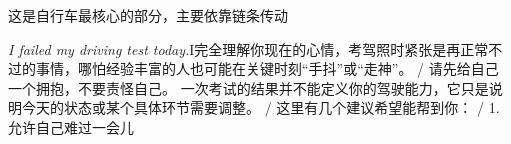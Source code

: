 \begin{multicols}{2}
这\allowbreak{}是\allowbreak{}自\allowbreak{}行\allowbreak{}车\allowbreak{}最\allowbreak{}核\allowbreak{}心\allowbreak{}的\allowbreak{}部\allowbreak{}分\allowbreak{}，\allowbreak{}主\allowbreak{}要\allowbreak{}依\allowbreak{}靠\allowbreak{}链\allowbreak{}条\allowbreak{}传\allowbreak{}动\allowbreak{}\par\noindent\textit{I failed my driving test today.}\enspace I完\allowbreak{}全\allowbreak{}理\allowbreak{}解\allowbreak{}你\allowbreak{}现\allowbreak{}在\allowbreak{}的\allowbreak{}心\allowbreak{}\allowbreak{}情\allowbreak{}，\allowbreak{}考\allowbreak{}驾\allowbreak{}照\allowbreak{}时\allowbreak{}紧\allowbreak{}张\allowbreak{}是\allowbreak{}再\allowbreak{}\allowbreak{}正\allowbreak{}常\allowbreak{}不\allowbreak{}过\allowbreak{}的\allowbreak{}事\allowbreak{}情\allowbreak{}，\allowbreak{}哪\allowbreak{}怕\allowbreak{}\allowbreak{}经\allowbreak{}验\allowbreak{}丰\allowbreak{}富\allowbreak{}的\allowbreak{}人\allowbreak{}也\allowbreak{}可\allowbreak{}能\allowbreak{}在\allowbreak{}\allowbreak{}关\allowbreak{}键\allowbreak{}时\allowbreak{}刻\allowbreak{}“手\allowbreak{}抖\allowbreak{}”或\allowbreak{}“\allowbreak{}走\allowbreak{}神\allowbreak{}”。\allowbreak{} / 请\allowbreak{}先\allowbreak{}给\allowbreak{}自\allowbreak{}己\allowbreak{}一\allowbreak{}个\allowbreak{}拥\allowbreak{}抱\allowbreak{}，\allowbreak{}不\allowbreak{}要\allowbreak{}责\allowbreak{}怪\allowbreak{}自\allowbreak{}己\allowbreak{}。\allowbreak{} 一\allowbreak{}次\allowbreak{}考\allowbreak{}试\allowbreak{}的\allowbreak{}结\allowbreak{}果\allowbreak{}并\allowbreak{}不\allowbreak{}能\allowbreak{}\allowbreak{}定\allowbreak{}义\allowbreak{}你\allowbreak{}的\allowbreak{}驾\allowbreak{}驶\allowbreak{}能\allowbreak{}力\allowbreak{}，\allowbreak{}它\allowbreak{}\allowbreak{}只\allowbreak{}是\allowbreak{}说\allowbreak{}明\allowbreak{}今\allowbreak{}天\allowbreak{}的\allowbreak{}状\allowbreak{}态\allowbreak{}或\allowbreak{}\allowbreak{}某\allowbreak{}个\allowbreak{}具\allowbreak{}体\allowbreak{}环\allowbreak{}节\allowbreak{}需\allowbreak{}要\allowbreak{}调\allowbreak{}整\allowbreak{}\allowbreak{}。\allowbreak{} / 这\allowbreak{}里\allowbreak{}有\allowbreak{}几\allowbreak{}个\allowbreak{}建\allowbreak{}议\allowbreak{}希\allowbreak{}望\allowbreak{}能\allowbreak{}帮\allowbreak{}到\allowbreak{}你\allowbreak{}：\allowbreak{} / 1. 允\allowbreak{}许\allowbreak{}自\allowbreak{}己\allowbreak{}难\allowbreak{}过\allowbreak{}一\allowbreak{}会\allowbreak{}儿\allowbreak{}\par\medskip

\end{multicols}
